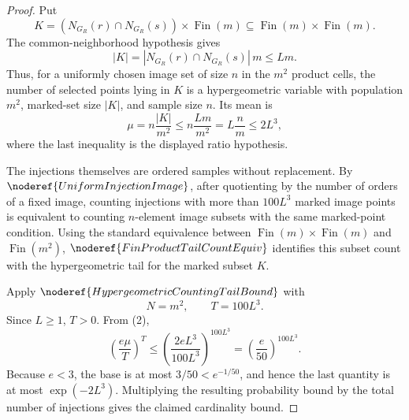 
\begin{proof}
Put
\[
K=(N_{G_R}(r)\cap N_{G_R}(s))\times\operatorname{Fin}(m)
\subseteq \operatorname{Fin}(m)\times\operatorname{Fin}(m).
\]
The common-neighborhood hypothesis gives
\[
|K|=|N_{G_R}(r)\cap N_{G_R}(s)|\,m\le Lm.
\tag{1}
\]
Thus, for a uniformly chosen image set of size \(n\) in the \(m^2\) product
cells, the number of selected points lying in \(K\) is a hypergeometric
variable with population \(m^2\), marked-set size \(|K|\), and sample size
\(n\).  Its mean is
\[
\mu=n\frac{|K|}{m^2}
\le n\frac{Lm}{m^2}
=L\frac nm
\le 2L^3,
\tag{2}
\]
where the last inequality is the displayed ratio hypothesis.

The injections themselves are ordered samples without replacement.  By
\(\noderef{UniformInjectionImage}\), after quotienting by the number of
orders of a fixed image, counting injections with more than \(100L^3\) marked
image points is equivalent to counting \(n\)-element image subsets with the
same marked-point condition.  Using the standard equivalence between
\(\operatorname{Fin}(m)\times\operatorname{Fin}(m)\) and
\(\operatorname{Fin}(m^2)\), \(\noderef{FinProductTailCountEquiv}\) identifies
this subset count with the hypergeometric tail for the marked subset \(K\).

Apply \(\noderef{HypergeometricCountingTailBound}\) with
\[
N=m^2,\qquad T=100L^3 .
\]
Since \(L\ge1\), \(T>0\).  From (2),
\[
\left(\frac{e\mu}{T}\right)^T
\le
\left(\frac{2eL^3}{100L^3}\right)^{100L^3}
=\left(\frac e{50}\right)^{100L^3}.
\]
Because \(e<3\), the base is at most \(3/50<e^{-1/50}\), and hence the last
quantity is at most \(\exp(-2L^3)\).  Multiplying the resulting probability
bound by the total number of injections gives the claimed cardinality bound.
\end{proof}
